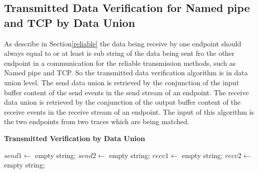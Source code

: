 \subsection{Transmitted Data Verification for Named pipe and TCP by Data Union}
As describe in Section\ref{reliable} the data being receive by one endpoint should always equal to or at least is sub string of the data being sent fro the other endpoint in a communication for the reliable transmission methods, such as Named pipe and TCP. So the transmitted data verification algorithm is in data union level. The send data union is retrieved by the conjunction of the input buffer content of the send events in the send stream of an endpoint. The receive data union is retrieved by the conjunction of the output buffer content of the receive events in the receive stream of an endpoint. The input of this algorithm is the two endpoints from two traces which are being matched.
\begin{algorithm}[H]
\DontPrintSemicolon
\caption{{\bf Transmitted Verification by Data Union} \label{dataAlg1}}
$send1 \leftarrow$ empty string;\;
$send2 \leftarrow$ empty string;\;
$recv1 \leftarrow$ empty string;\;
$recv2 \leftarrow$ empty string;\;

\end{algorithm} 


